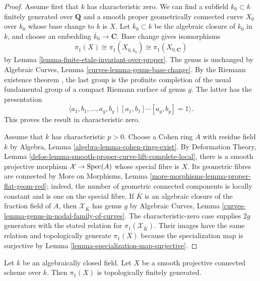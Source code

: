 \begin{proof}
Assume first that $k$ has characteristic zero. We can find a subfield
$k_0 \subset k$ finitely generated over $\mathbf{Q}$ and a smooth proper
geometrically connected curve $X_0$ over $k_0$ whose base change to $k$
is $X$. Let $\overline{k}_0 \subset k$ be the algebraic closure of $k_0$
in $k$, and choose an embedding $\overline{k}_0 \to \mathbf{C}$.
Base change gives isomorphisms
$$
\pi_1(X) \cong \pi_1(X_{0, \overline{k}_0})
\cong \pi_1(X_{0, \mathbf{C}})
$$
by Lemma \ref{lemma-finite-etale-invariant-over-proper}. The genus is
unchanged by Algebraic Curves, Lemma
\ref{curves-lemma-genus-base-change}. By the Riemann existence theorem
\cite[Expos\'e XII, Corollaire 5.2]{SGA1}, the last group is the profinite
completion of the usual fundamental group of a compact Riemann surface of
genus $g$. The latter has the presentation
$$
\langle a_1, b_1, \ldots, a_g, b_g \mid
[a_1, b_1] \cdots [a_g, b_g] = 1 \rangle.
$$
This proves the result in characteristic zero.

\medskip\noindent
Assume that $k$ has characteristic $p > 0$. Choose a Cohen ring $A$ with
residue field $k$ by Algebra, Lemma
\ref{algebra-lemma-cohen-rings-exist}. By Deformation Theory, Lemma
\ref{defos-lemma-smooth-proper-curve-lift-complete-local}, there is a
smooth projective morphism $\mathcal{X} \to \mathop{\mathrm{Spec}}(A)$ whose special fibre
is $X$. Its geometric fibres are connected by More on Morphisms, Lemma
\ref{more-morphisms-lemma-proper-flat-geom-red}; indeed, the number of
geometric connected components is locally constant and is one on the
special fibre. If $\overline{K}$ is an algebraic closure of the fraction
field of $A$, then $\mathcal{X}_{\overline{K}}$ has genus $g$ by
Algebraic Curves, Lemma
\ref{curves-lemma-genus-in-nodal-family-of-curves}. The characteristic-zero
case supplies $2g$ generators with the stated relation for
$\pi_1(\mathcal{X}_{\overline{K}})$. Their images have the same relation
and topologically generate $\pi_1(X)$ because the specialization map is
surjective by Lemma \ref{lemma-specialization-map-surjective}.
\end{proof}

\begin{proposition}
\label{proposition-fundamental-group-smooth-projective-finitely-generated}
\begin{reference}
\cite[Expos\'e 182, Corollaire 4, pp. 217--218]{FGA}
\end{reference}
Let $k$ be an algebraically closed field. Let $X$ be a smooth projective
connected scheme over $k$. Then $\pi_1(X)$ is topologically finitely
generated.
\end{proposition}

